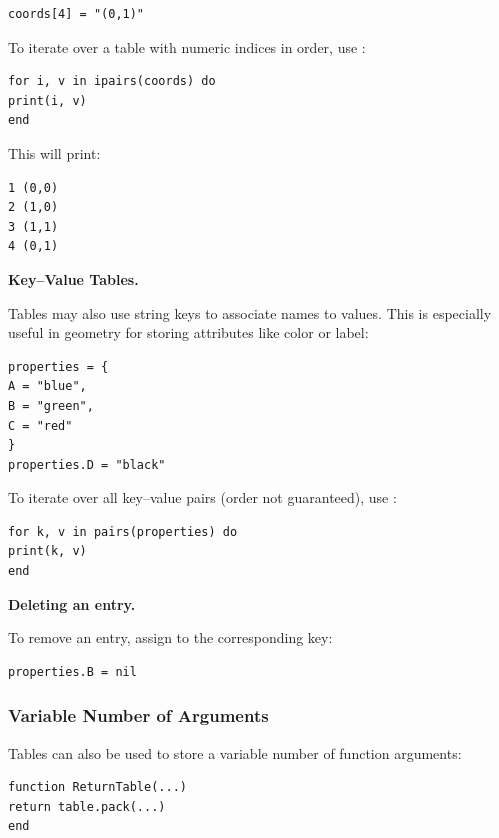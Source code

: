 \begin{verbatim}
coords[4] = "(0,1)"
\end{verbatim}

To iterate over a table with numeric indices in order, use :

\begin{mybox}
\begin{verbatim}
for i, v in ipairs(coords) do
print(i, v)
end
\end{verbatim}
\end{mybox}

This will print:

\begin{verbatim}
1 (0,0)
2 (1,0)
3 (1,1)
4 (0,1)
\end{verbatim}


\textbf{Key–Value Tables.}

Tables may also use string keys to associate names to values. This is especially useful in geometry for storing attributes like color or label:

\begin{mybox}
\begin{verbatim}
properties = {
A = "blue",
B = "green",
C = "red"
}
properties.D = "black"
\end{verbatim}
\end{mybox}

To iterate over all key–value pairs (order not guaranteed), use :

\begin{mybox}
\begin{verbatim}
for k, v in pairs(properties) do
print(k, v)
end
\end{verbatim}
\end{mybox}

\textbf{Deleting an entry.}

To remove an entry, assign  to the corresponding key:

\begin{verbatim}
properties.B = nil
\end{verbatim}


\subsubsection{Variable Number of Arguments}

Tables can also be used to store a variable number of function arguments:

\begin{mybox}
\begin{verbatim}
function ReturnTable(...)
return table.pack(...)
end
\end{verbatim}
\end{mybox}


